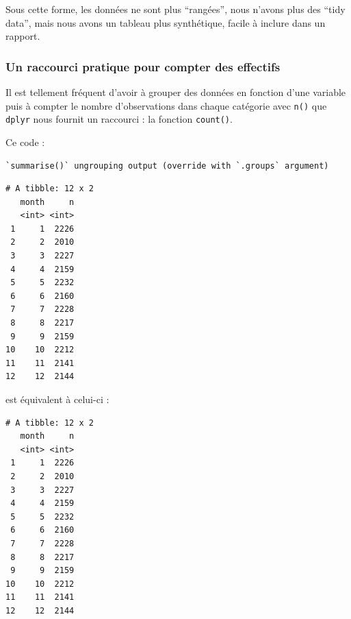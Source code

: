\documentclass[
  a4paper,
]{article}
\newenvironment{Shaded}{\begin{snugshade}}{\end{snugshade}}
\newcommand{\DataTypeTok}[1]{\textcolor[rgb]{0.00,0.34,0.68}{#1}}
\newcommand{\KeywordTok}[1]{\textcolor[rgb]{0.12,0.11,0.11}{\textbf{#1}}}
\newcommand{\NormalTok}[1]{\textcolor[rgb]{0.12,0.11,0.11}{#1}}
\newcommand{\OperatorTok}[1]{\textcolor[rgb]{0.12,0.11,0.11}{#1}}
\newcommand{\StringTok}[1]{\textcolor[rgb]{0.75,0.01,0.01}{#1}}
\begin{document}
Sous cette forme, les données ne sont plus ``rangées'', nous n'avons plus des ``tidy data'', mais nous avons un tableau plus synthétique, facile à inclure dans un rapport.

\hypertarget{un-raccourci-pratique-pour-compter-des-effectifs}{%
\subsubsection{Un raccourci pratique pour compter des effectifs}\label{un-raccourci-pratique-pour-compter-des-effectifs}}

Il est tellement fréquent d'avoir à grouper des données en fonction d'une variable puis à compter le nombre d'observations dans chaque catégorie avec \texttt{n()} que \texttt{dplyr} nous fournit un raccourci : la fonction \texttt{count()}.

Ce code :

\begin{Shaded}
\end{Shaded}

\begin{verbatim}
`summarise()` ungrouping output (override with `.groups` argument)
\end{verbatim}

\begin{verbatim}
# A tibble: 12 x 2
   month     n
   <int> <int>
 1     1  2226
 2     2  2010
 3     3  2227
 4     4  2159
 5     5  2232
 6     6  2160
 7     7  2228
 8     8  2217
 9     9  2159
10    10  2212
11    11  2141
12    12  2144
\end{verbatim}

est équivalent à celui-ci :

\begin{Shaded}
\end{Shaded}

\begin{verbatim}
# A tibble: 12 x 2
   month     n
   <int> <int>
 1     1  2226
 2     2  2010
 3     3  2227
 4     4  2159
 5     5  2232
 6     6  2160
 7     7  2228
 8     8  2217
 9     9  2159
10    10  2212
11    11  2141
12    12  2144
\end{verbatim}
\end{document}
